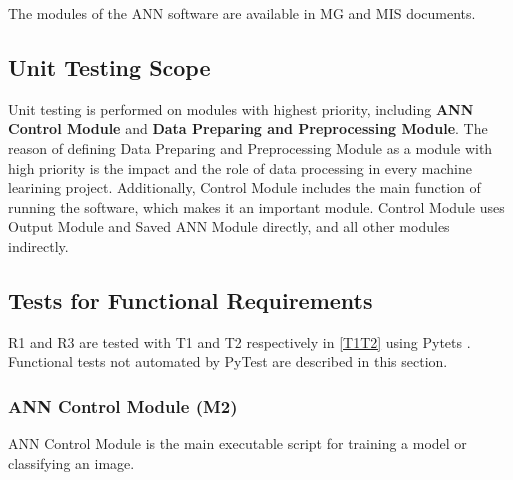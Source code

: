 \documentclass[12pt, titlepage]{article}
\begin{document}
The modules of the ANN software are available in MG \citep{MG} and 
MIS \citep{MIS} documents.

\subsection{Unit Testing Scope}

Unit testing is performed on modules with highest priority, including \textbf{ANN Control Module} 
and \textbf{Data Preparing and Preprocessing Module}. The reason of defining 
Data Preparing and Preprocessing Module as a module with high priority 
is the impact and the role of data processing in every machine learining project. 
Additionally, Control Module includes the main function of running the software, 
which makes it an important module. Control Module uses Output Module and Saved ANN Module 
directly, and all other modules indirectly. 

\subsection{Tests for Functional Requirements}

R1 and R3 are tested with T1 and T2 respectively in \ref{T1T2} using Pytets \citep{pytest}. 
Functional tests not automated by PyTest \citep{pytest} are described in this section.


\subsubsection{ ANN Control Module (M2)}

ANN Control Module is the main executable script for training a model or classifying an image.
\end{document}
